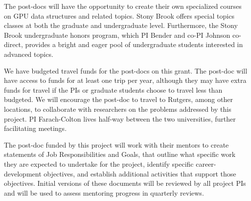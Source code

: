 The post-docs will have the opportunity to create their own
specialized courses on GPU data structures and related
topics.  Stony Brook offers special topics classes at both the
graduate and undergraduate level.  Furthermore, the Stony Brook
undergraduate 
honors program, which PI Bender and co-PI Johnson co-direct, provides
a bright and eager pool of undergraduate students interested in
advanced topics.

We have budgeted travel funds for the post-docs on this grant.  The
post-doc will have access to funds for at least one trip per year,
although they may have extra funds for travel if the PIs or graduate
students choose to travel less than budgeted.  We will encourage the
post-doc to travel to Rutgers, among other locations, to
collaborate with researchers on the problems addressed by this
project.  PI Farach-Colton lives half-way between the two
universities, further facilitating meetings.

The post-doc funded by this project will work with their mentors to create
statements of Job Responsibilities and Goals, that outline what
specific work they are expected to undertake for the project, identify
specific career-development objectives, and establish additional
activities that support those objectives. Initial versions of these
documents will be reviewed by all project PIs and will be used to
assess mentoring progress in quarterly reviews.
